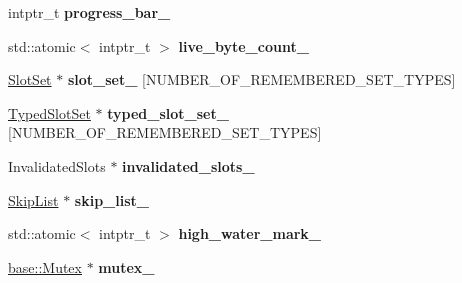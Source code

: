 \begin{DoxyCompactItemize}
\item 
\mbox{\label{classv8_1_1internal_1_1MemoryChunk_ace533f33587239580c9e87ef1e15dc49}} 
intptr\+\_\+t {\bfseries progress\+\_\+bar\+\_\+}
\item 
\mbox{\label{classv8_1_1internal_1_1MemoryChunk_a85f2339b20ae3866461a41c0748ba50f}} 
std\+::atomic$<$ intptr\+\_\+t $>$ {\bfseries live\+\_\+byte\+\_\+count\+\_\+}
\item 
\mbox{\label{classv8_1_1internal_1_1MemoryChunk_a9f68a9acc38b3d65163f4c1c5c9d1949}} 
\mbox{\hyperlink{classv8_1_1internal_1_1SlotSet}{Slot\+Set}} $\ast$ {\bfseries slot\+\_\+set\+\_\+} \mbox{[}N\+U\+M\+B\+E\+R\+\_\+\+O\+F\+\_\+\+R\+E\+M\+E\+M\+B\+E\+R\+E\+D\+\_\+\+S\+E\+T\+\_\+\+T\+Y\+P\+ES\mbox{]}
\item 
\mbox{\label{classv8_1_1internal_1_1MemoryChunk_ac5a33452dcf9cdc297d819144737c336}} 
\mbox{\hyperlink{classv8_1_1internal_1_1TypedSlotSet}{Typed\+Slot\+Set}} $\ast$ {\bfseries typed\+\_\+slot\+\_\+set\+\_\+} \mbox{[}N\+U\+M\+B\+E\+R\+\_\+\+O\+F\+\_\+\+R\+E\+M\+E\+M\+B\+E\+R\+E\+D\+\_\+\+S\+E\+T\+\_\+\+T\+Y\+P\+ES\mbox{]}
\item 
\mbox{\label{classv8_1_1internal_1_1MemoryChunk_a90152c45635de1e94f7b56dcaa56af97}} 
Invalidated\+Slots $\ast$ {\bfseries invalidated\+\_\+slots\+\_\+}
\item 
\mbox{\label{classv8_1_1internal_1_1MemoryChunk_a0f375a7b0d832bbca116e0d208e14227}} 
\mbox{\hyperlink{classv8_1_1internal_1_1SkipList}{Skip\+List}} $\ast$ {\bfseries skip\+\_\+list\+\_\+}
\item 
\mbox{\label{classv8_1_1internal_1_1MemoryChunk_a7b56ab5ec05a7f0e75613a25ed98391e}} 
std\+::atomic$<$ intptr\+\_\+t $>$ {\bfseries high\+\_\+water\+\_\+mark\+\_\+}
\item 
\mbox{\label{classv8_1_1internal_1_1MemoryChunk_adcba9ea489940cd11899faba32202079}} 
\mbox{\hyperlink{classv8_1_1base_1_1Mutex}{base\+::\+Mutex}} $\ast$ {\bfseries mutex\+\_\+}

\end{DoxyCompactItemize}
